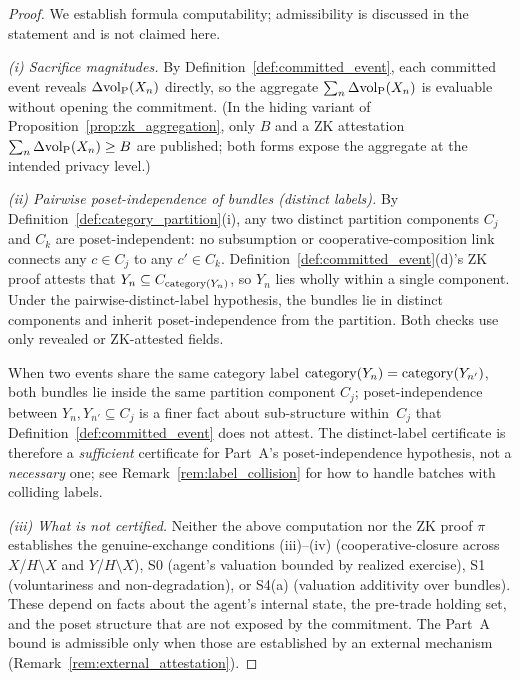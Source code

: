 \begin{proof}
We establish formula computability; admissibility is discussed
in the statement and is not claimed here.

\emph{(i) Sacrifice magnitudes.}
By Definition~\ref{def:committed_event}, each committed event
reveals $\Delta{\operatorname{vol}_{\mathrm{P}}}(X_n)$ directly, so the aggregate
$\sum_n \Delta{\operatorname{vol}_{\mathrm{P}}}(X_n)$ is evaluable without opening the
commitment.  (In the hiding variant of
Proposition~\ref{prop:zk_aggregation}, only $B$ and a ZK
attestation $\sum_n \Delta{\operatorname{vol}_{\mathrm{P}}}(X_n) \geq B$ are published;
both forms expose the aggregate at the intended privacy level.)

\emph{(ii) Pairwise poset-independence of bundles (distinct
labels).}
By Definition~\ref{def:category_partition}(i), any two distinct
partition components $C_j$ and $C_k$ are poset-independent: no
subsumption or cooperative-composition link connects any
$c \in C_j$ to any $c' \in C_k$.
Definition~\ref{def:committed_event}(d)'s ZK proof attests that
$Y_n \subseteq C_{\mathrm{category}(Y_{n})}$, so $Y_n$ lies wholly within a
single component.  Under the pairwise-distinct-label
hypothesis, the bundles lie in distinct components and inherit
poset-independence from the partition.  Both checks use only
revealed or ZK-attested fields.

When two events share the same category label
$\mathrm{category}(Y_{n}) = \mathrm{category}(Y_{n'})$, both bundles lie inside the same
partition component $C_j$; poset-independence between
$Y_n, Y_{n'} \subseteq C_j$ is a finer fact about sub-structure
within~$C_j$ that Definition~\ref{def:committed_event} does not
attest.  The distinct-label certificate is therefore a
\emph{sufficient} certificate for Part~A's
poset-independence hypothesis, not a \emph{necessary} one; see
Remark~\ref{rem:label_collision} for how to handle batches with
colliding labels.

\emph{(iii) What is not certified.}
Neither the above computation nor the ZK proof $\pi$ establishes
the genuine-exchange conditions (iii)--(iv)
(cooperative-closure across $X$/$H \setminus X$ and
$Y$/$H \setminus X$), S0 (agent's valuation bounded by realized
exercise), S1 (voluntariness and non-degradation), or S4(a)
(valuation additivity over bundles).  These depend on facts
about the agent's internal state, the pre-trade holding set,
and the poset structure that are not exposed by the commitment.
The Part~A bound is admissible only when those are established
by an external mechanism (Remark~\ref{rem:external_attestation}).
\end{proof}

